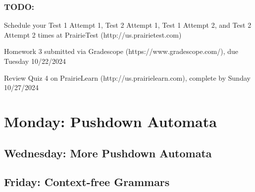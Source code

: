 \vspace{-20pt}

\subsubsection*{TODO:}
\begin{list}{\itemsep-10pt}
   \item Schedule your Test 1 Attempt 1, Test 2 Attempt 1, Test 1 Attempt 2, and Test 2 Attempt 2 times 
   at PrairieTest (http://us.prairietest.com)
   \item Homework 3 submitted via Gradescope (https://www.gradescope.com/), due Tuesday 10/22/2024
   \item Review Quiz 4 on PrairieLearn (http://us.prairielearn.com), complete by Sunday 10/27/2024
\end{list}

\newpage
\section*{Monday: Pushdown Automata}


    
\newpage
\subsection*{Wednesday: More Pushdown Automata}




\newpage
\subsection*{Friday: Context-free Grammars}



\newpage

